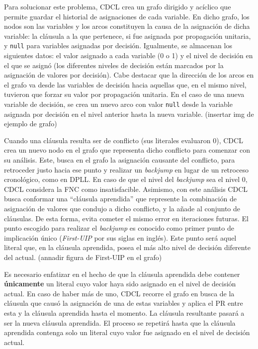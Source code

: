 Para solucionar este problema, CDCL crea un grafo dirigido y ac\'iclico que permite guardar el historial de asignaciones de cada variable. En dicho grafo, los nodos son las variables y los arcos constituyen la causa de la asignaci\'on de dicha variable: la cl\'ausula a la que pertenece, si fue asignada por propagaci\'on unitaria, y \texttt{null} para variables asignadas por decisi\'on. Igualmente, se almacenan los siguientes datos: el valor asignado a cada variable (0 o 1) y el nivel de decisi\'on en el que se asign\'o (los diferentes niveles de decisi\'on est\'an marcados por la asignaci\'on de valores por decisi\'on). Cabe destacar que la direcci\'on de los arcos en el grafo va desde las variables de decisi\'on hacia aquellas que, en el mismo nivel, tuvieron que forzar su valor por propagaci\'on unitaria. En el caso de una nueva variable de decisi\'on, se crea un nuevo arco con valor \texttt{null} desde la variable asignada por decisi\'on en el nivel anterior hasta la nueva variable. (insertar img de ejemplo de grafo)

Cuando una cl\'ausula resulta ser de conflicto (sus literales evaluaron 0), CDCL crea un nuevo nodo en el grafo que representa dicho conflicto para comenzar con su an\'alisis. Este, busca en el grafo la asignaci\'on causante del conflicto, para retroceder justo hacia ese punto y realizar un \textit{backjump} en lugar de un retroceso cronol\'ogico, como en DPLL. En caso de que el nivel del \textit{backjump} sea el nivel 0, CDCL considera la FNC como insatisfacible. Asimismo, con este an\'alisis CDCL busca conformar una ``cl\'ausula aprendida'' que represente la combinaci\'on de asignaci\'on de valores que condujo a dicho conflicto, y la a\~nade al conjunto de cl\'ausulas. De esta forma, evita cometer el mismo error en iteraciones futuras. El punto escogido para realizar el \textit{backjump} es conocido como primer punto de implicaci\'on \'unico (\textit{First-UIP} por sus siglas en ingl\'es). Este punto ser\'a aquel literal que, en la cl\'ausula aprendida, posea el m\'as alto nivel de decisi\'on diferente del actual. (annadir figura de First-UIP en el grafo)

Es necesario enfatizar en el hecho de que la cl\'ausula aprendida debe contener \textbf{\'unicamente} un literal cuyo valor haya sido asignado en el nivel de decisi\'on actual. En caso de haber m\'as de uno, CDCL recorre el grafo en busca de la cl\'ausula que caus\'o la asignaci\'on de una de estas variables y aplica el PR entre esta y la cl\'ausula aprendida hasta el momento. La cl\'ausula resultante pasar\'a a ser la nueva cl\'ausula aprendida. El proceso se repetir\'a hasta que la cl\'ausula aprendida contenga solo un literal cuyo valor fue asignado en el nivel de decisi\'on actual.

